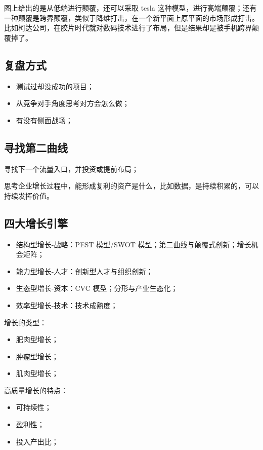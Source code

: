 \documentclass[12pt]{article}
\begin{document}
图上给出的是从低端进行颠覆，还可以采取 tesla 这种模型，进行高端颠覆；还有一种颠覆是跨界颠覆，类似于降维打击，在一个新平面上原平面的市场形成打击。比如柯达公司，在胶片时代就对数码技术进行了布局，但是结果却是被手机跨界颠覆掉了。

\subsection{复盘方式}
\begin{itemize}
\setlength{\itemsep}{0pt}
\setlength{\parsep}{0pt}
\setlength{\parskip}{0pt}
    \item 测试过却没成功的项目；
    \item 从竞争对手角度思考对方会怎么做；
    \item 有没有侧面战场；
\end{itemize}

\subsection{寻找第二曲线}
寻找下一个流量入口，并投资或提前布局；

思考企业增长过程中，能形成复利的资产是什么，比如数据，是持续积累的，可以持续发挥价值。

\subsection{四大增长引擎}
\begin{itemize}
\setlength{\itemsep}{0pt}
\setlength{\parsep}{0pt}
\setlength{\parskip}{0pt}
    \item 结构型增长-战略：PEST 模型/SWOT 模型；第二曲线与颠覆式创新；增长机会矩阵；
    \item 能力型增长-人才：创新型人才与组织创新；
    \item 生态型增长-资本：CVC 模型；分形与产业生态化；
    \item 效率型增长-技术：技术成熟度；
\end{itemize}

增长的类型：
\begin{itemize}
\setlength{\itemsep}{0pt}
\setlength{\parsep}{0pt}
\setlength{\parskip}{0pt}
    \item 肥肉型增长；
    \item 肿瘤型增长；
    \item 肌肉型增长；
\end{itemize}

高质量增长的特点：
\begin{itemize}
\setlength{\itemsep}{0pt}
\setlength{\parsep}{0pt}
\setlength{\parskip}{0pt}
    \item 可持续性；
    \item 盈利性；
    \item 投入产出比；
\end{itemize}
\end{document}
